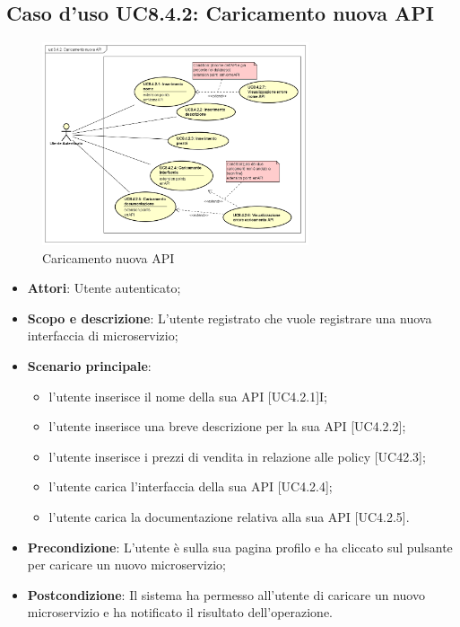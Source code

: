 \documentclass[12pt,a4paper,titlepage]{article}
\begin{document}
	\subsection{Caso d'uso UC8.4.2: Caricamento nuova API}
	\label{UC8.4.2}
	\begin{figure}[H]
		\centering
		\includegraphics[width=0.7\textwidth]{UseCase/CaricamentoNuovaAPI}
		\caption{Caricamento nuova API}
	\end{figure}
	\begin{itemize}
		\item \textbf{Attori}: Utente autenticato;
		\item \textbf{Scopo e descrizione}: L'utente registrato che vuole registrare una nuova interfaccia di microservizio;
		\item \textbf{Scenario principale}:
			\begin{itemize}
				\item l'utente inserisce il nome della sua API [UC4.2.1]I;
				\item l'utente inserisce una breve descrizione per la sua API [UC4.2.2];
				\item l'utente inserisce i prezzi di vendita in relazione alle policy [UC42.3];
				\item l'utente carica l'interfaccia della sua API [UC4.2.4];
				\item l'utente carica la documentazione relativa alla sua API [UC4.2.5].
			\end{itemize}
		\item \textbf{Precondizione}: L'utente è sulla sua pagina profilo e ha cliccato sul pulsante per caricare un nuovo microservizio;
		\item \textbf{Postcondizione}: Il sistema ha permesso all'utente di caricare un nuovo microservizio e ha notificato il risultato dell'operazione.
	\end{itemize}
\end{document}
